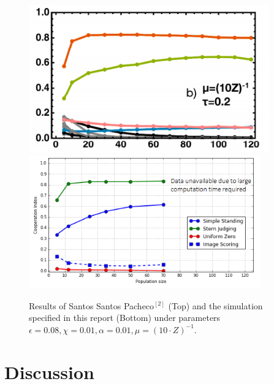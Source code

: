 \documentclass[10pt,a4paper]{article}
\begin{document}
\begin{figure}[h!]
\begin{center}
  \includegraphics[width=28em]{SSP_Results.PNG}
  \includegraphics[width=27em]{simulation_results_cropped.PNG}
\end{center}
  \caption{Results of Santos Santos Pacheco$^{[2]}$ (Top) and the simulation specified in this report (Bottom) under parameters $\epsilon = 0.08, \chi = 0.01, \alpha = 0.01, \mu = (10 \cdot Z)^{-1}$.}
  \label{fig:SSPresults1}
\end{figure}
\pagebreak

\section{Discussion}
\end{document}
